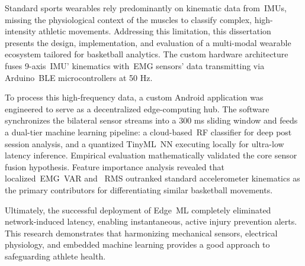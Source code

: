 
%

Standard sports wearables rely predominantly on kinematic data from~\glspl{IMU}, missing the physiological context of the
muscles to classify complex, high-intensity athletic movements. Addressing this limitation, this dissertation presents the design, implementation, and evaluation of a multi-modal
wearable ecosystem tailored for basketball analytics. The custom hardware architecture fuses 9-axis~\gls{IMU}' kinematics with~\gls{EMG} sensors'
data transmitting via Arduino~\gls{BLE} microcontrollers at 50 Hz.

To process this high-frequency data, a custom Android application was engineered to serve as a decentralized edge-computing hub. The software synchronizes the bilateral
sensor streams into a 300 ms sliding window and feeds a dual-tier machine learning pipeline: a cloud-based~\gls{RF} classifier for deep post session
analysis, and a quantized TinyML~\gls{NN} executing locally for ultra-low latency inference. Empirical evaluation mathematically validated the core sensor fusion hypothesis. Feature
importance analysis revealed that localized~\gls{EMG}~\gls{VAR} and ~\gls{RMS} outranked standard accelerometer kinematics as the primary contributors
for differentiating similar basketball movements. 

Ultimately, the successful deployment of Edge~\gls{ML} completely eliminated network-induced latency, enabling
instantaneous, active injury prevention alerts. This research demonstrates that harmonizing mechanical sensors, electrical physiology, and embedded machine learning provides
a good approach to safeguarding athlete health.


